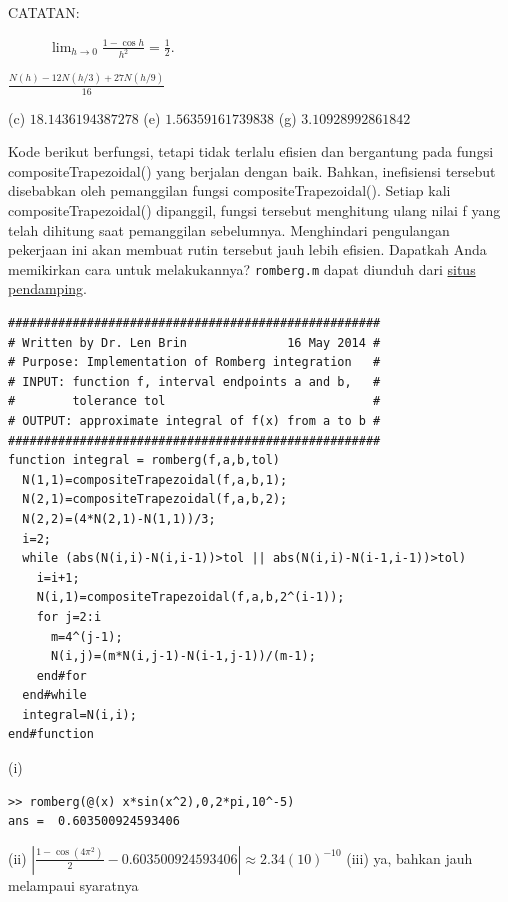\begin{description}
\begin{description}
\item [{CATATAN:}] $\lim_{h\to0}\frac{1-\cos h}{h^{2}}=\frac{1}{2}$.
\end{description}
\item [{\ref{exc:calculus-extrapolation-7}:}] ${\displaystyle \frac{N(h)-12N(h/3)+27N(h/9)}{16}}$
\item [{\ref{exc:calculus-extrapolation-11}:}] (c) $18.1436194387278$
(e) $1.56359161739838$ (g) $3.10928992861842$
\item [{\ref{exc:calculus-extrapolation-8}:}] Kode berikut berfungsi,
tetapi tidak terlalu efisien dan bergantung pada fungsi compositeTrapezoidal()
yang berjalan dengan baik. Bahkan, inefisiensi tersebut disebabkan
oleh pemanggilan fungsi compositeTrapezoidal(). Setiap kali compositeTrapezoidal()
dipanggil, fungsi tersebut menghitung ulang nilai f yang telah dihitung
saat pemanggilan sebelumnya. Menghindari pengulangan pekerjaan ini
akan membuat rutin tersebut jauh lebih efisien. Dapatkah Anda memikirkan
cara untuk melakukannya? \texttt{romberg.m} dapat diunduh dari \href{http://lqbrin.github.io/tea-time-numerical/ancillaries.html}{situs pendamping}.
 \begin{verbatim}
####################################################
# Written by Dr. Len Brin              16 May 2014 #
# Purpose: Implementation of Romberg integration   #
# INPUT: function f, interval endpoints a and b,   #
#        tolerance tol                             #
# OUTPUT: approximate integral of f(x) from a to b #
####################################################
function integral = romberg(f,a,b,tol)
  N(1,1)=compositeTrapezoidal(f,a,b,1);
  N(2,1)=compositeTrapezoidal(f,a,b,2);
  N(2,2)=(4*N(2,1)-N(1,1))/3;
  i=2;
  while (abs(N(i,i)-N(i,i-1))>tol || abs(N(i,i)-N(i-1,i-1))>tol)
    i=i+1;
    N(i,1)=compositeTrapezoidal(f,a,b,2^(i-1));
    for j=2:i
      m=4^(j-1);
      N(i,j)=(m*N(i,j-1)-N(i-1,j-1))/(m-1);
    end#for
  end#while
  integral=N(i,i);
end#function
\end{verbatim}
\item [{\ref{exc:calculus-extrapolation-9}:}] (i) \begin{verbatim}
>> romberg(@(x) x*sin(x^2),0,2*pi,10^-5)
ans =  0.603500924593406
\end{verbatim}(ii) ${\displaystyle \left|\frac{1-\cos(4\pi^{2})}{2}-0.603500924593406\right|\approx2.34(10)^{-10}}$
(iii) ya, bahkan jauh melampaui syaratnya
\end{description}

